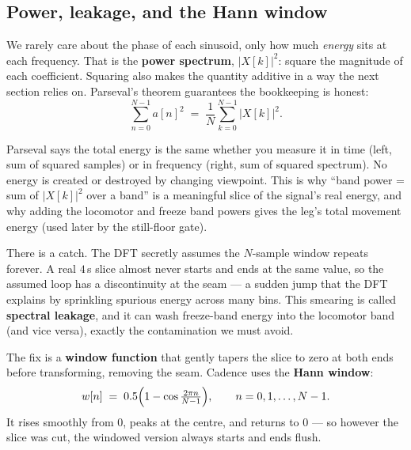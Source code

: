 \subsection{Power, leakage, and the Hann window}

We rarely care about the phase of each sinusoid, only how much \emph{energy} sits at
each frequency. That is the \textbf{power spectrum}, \(|X[k]|^2\): square the magnitude
of each coefficient. Squaring also makes the quantity additive in a way the next
section relies on. Parseval's theorem guarantees the bookkeeping is honest:
\begin{equation}
\sum_{n=0}^{N-1} a[n]^2 \;=\; \frac{1}{N}\sum_{k=0}^{N-1} \bigl|X[k]\bigr|^2 .
\label{eq:parseval}
\end{equation}

\begin{mathsbox}
Parseval says the total energy is the same whether you measure it in time
(left, sum of squared samples) or in frequency (right, sum of squared spectrum). No
energy is created or destroyed by changing viewpoint. This is why ``band power = sum
of \(|X[k]|^2\) over a band'' is a meaningful slice of the signal's real energy, and
why adding the locomotor and freeze band powers gives the leg's total movement energy
(used later by the still-floor gate).
\end{mathsbox}

There is a catch. The DFT secretly assumes the \(N\)-sample window repeats forever. A
real \(4\,\)s slice almost never starts and ends at the same value, so the assumed
loop has a discontinuity at the seam --- a sudden jump that the DFT explains by
sprinkling spurious energy across many bins. This smearing is called \textbf{spectral
leakage}, and it can wash freeze-band energy into the locomotor band (and vice versa),
exactly the contamination we must avoid.

The fix is a \textbf{window function} that gently tapers the slice to zero at both
ends before transforming, removing the seam. Cadence uses the \textbf{Hann window}:
\begin{equation}
w[n] \;=\; 0.5\Bigl(1-\cos\tfrac{2\pi n}{N-1}\Bigr),
\qquad n=0,1,\dots,N-1 .
\label{eq:hann}
\end{equation}
It rises smoothly from \(0\), peaks at the centre, and returns to \(0\) --- so however
the slice was cut, the windowed version always starts and ends flush.

